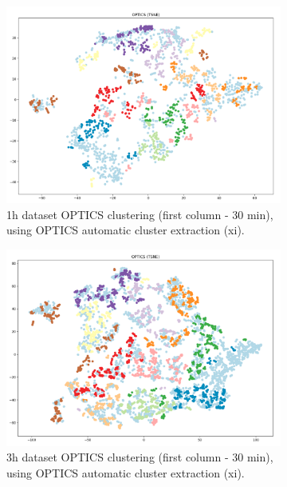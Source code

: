 \begin{figure}[H]
  \centering
  \begin{subfigure}{.5\textwidth}\captionsetup{width=.8\linewidth}
    \centering
    \includegraphics[width=1\textwidth]{./images/clusteringResults/1h-1-OPTICS-xi.png}
  \caption{1h dataset OPTICS clustering (first column - 30 min), using OPTICS automatic cluster extraction (xi).}
  \end{subfigure}%
  \hfill
  \begin{subfigure}{.5\textwidth}\captionsetup{width=.8\linewidth}
    \centering
    \includegraphics[width=1\textwidth]{./images/clusteringResults/3h-1-OPTICS-xi.png}
    \caption{3h dataset OPTICS clustering (first column - 30 min), using OPTICS automatic cluster extraction (xi).}
  \end{subfigure}
  \caption{}
  \label{figure:OPTICSXiResults}
  \end{figure}

